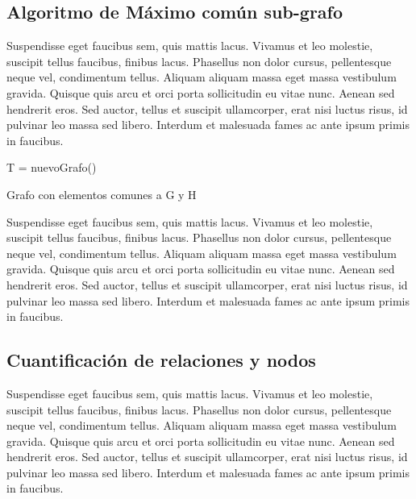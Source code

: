 \subsection {Algoritmo de Máximo común sub-grafo}\label{Algoritmo}

Suspendisse eget faucibus sem, quis mattis lacus. Vivamus et leo molestie, suscipit tellus faucibus, finibus lacus. Phasellus non dolor cursus, pellentesque neque vel, condimentum tellus. Aliquam aliquam massa eget massa vestibulum gravida. Quisque quis arcu et orci porta sollicitudin eu vitae nunc. Aenean sed hendrerit eros. Sed auctor, tellus et suscipit ullamcorper, erat nisi luctus risus, id pulvinar leo massa sed libero. Interdum et malesuada fames ac ante ipsum primis in faucibus. 


\begin{algorithm}[H]
    T = nuevoGrafo()\;
    \; 
    \caption{Grafo con elementos comunes a G y H}
\end{algorithm}


Suspendisse eget faucibus sem, quis mattis lacus. Vivamus et leo molestie, suscipit tellus faucibus, finibus lacus. Phasellus non dolor cursus, pellentesque neque vel, condimentum tellus. Aliquam aliquam massa eget massa vestibulum gravida. Quisque quis arcu et orci porta sollicitudin eu vitae nunc. Aenean sed hendrerit eros. Sed auctor, tellus et suscipit ullamcorper, erat nisi luctus risus, id pulvinar leo massa sed libero. Interdum et malesuada fames ac ante ipsum primis in faucibus.

\label{def:cuantificacion}

\subsection {Cuantificación de relaciones y nodos}

Suspendisse eget faucibus sem, quis mattis lacus. Vivamus et leo molestie, suscipit tellus faucibus, finibus lacus. Phasellus non dolor cursus, pellentesque neque vel, condimentum tellus. Aliquam aliquam massa eget massa vestibulum gravida. Quisque quis arcu et orci porta sollicitudin eu vitae nunc. Aenean sed hendrerit eros. Sed auctor, tellus et suscipit ullamcorper, erat nisi luctus risus, id pulvinar leo massa sed libero. Interdum et malesuada fames ac ante ipsum primis in faucibus.